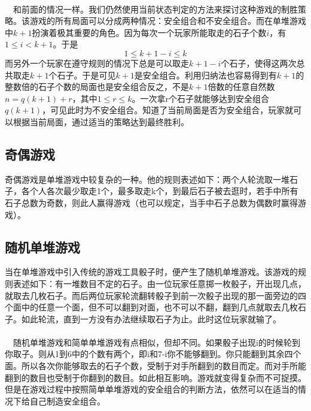 \documentclass[UTF8,nofonts,cs4size]{ctexrep}
\begin{document}
\paragraph{}
\indent\ \
和前面的情况一样。我们仍然使用当前状态判定的方法来探讨这种游戏的制胜策略。该游戏的所有局面可以分成两种情况：安全组合和不安全组合。而在单堆游戏中$k+1$扮演着极其重要的角色。因为每次一个玩家所能取走的石子个数$i$，有$1\leq i < k+1$。于是
\[
1 \leq k+1-i \leq k
\]
而另外一个玩家在遵守规则的情况下总是可以取走$k+1-i$个石子，使得这两次总共取走$k+1$个石子。于是可见$k+1$是安全组合。利用归纳法也容易得到有$k+1$的整数倍的石子个数的局面也是安全组合反之，不是$k+1$倍数的任意自然数$n=q(k+1)+r$，其中$1 \leq r \leq k$。一次拿r个石子就能够达到安全组合$q(k+1)$，可见此时为不安全组合。知道了当前局面是否为安全组合，玩家就可以根据当前局面，通过适当的策略达到最终胜利。
\subsection{奇偶游戏}
奇偶游戏是单堆游戏中较复杂的一种。他的规则表述如下：两个人轮流取一堆石子，各个人各次最少取走1个，最多取走k个，到最后石子被去逛时，若手中所有石子总数为奇数，则此人赢得游戏（也可以规定，当手中石子总数为偶数时赢得游戏）。

\subsection{随机单堆游戏}
当在单堆游戏中引入传统的游戏工具骰子时，便产生了随机单堆游戏。该游戏的规则表述如下：有一堆数目不定的石子。由一位玩家任意掷一枚骰子，开出现几点，就取去几枚石子。而后两位玩家轮流翻转骰子到前一次骰子出现的那一面旁边的四个面中的任意一个面，但不可以翻到对面，也不可以不翻，翻到几点就取去几枚石子。如此轮流，直到一方没有办法继续取石子为止。此时这位玩家就输了。
\paragraph{}
\indent\ \
随机单堆游戏和简单单堆游戏有点相似，但却不同。如果骰子出现i的时候轮到你取子。则从1到6中的个数有两个，即i和7-i你不能够翻到。你只能翻到其余四个面。所以各次你能够取去的石子个数，受制于对手所翻到的数目而定。而对手所能翻到的数目也受制于你翻到的数目。如此相互影响。游戏就变得复杂而不可捉摸。但是在游戏过程中按照简单单堆游戏的安全组合的判断方法，依然可以在适当的情况下给自己制造安全组合。
\end{document}
